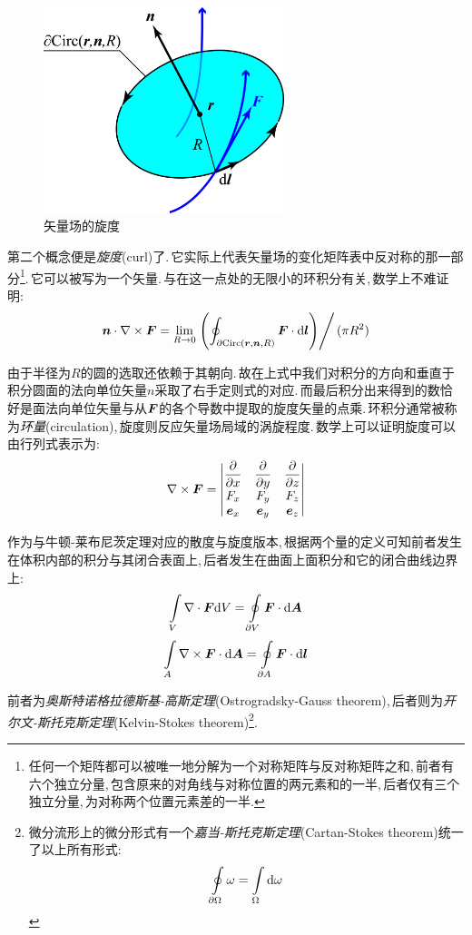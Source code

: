 \begin{figure}
\centering
\vspace{0.5cm}
\includegraphics[width=7cm]{image/7-1-5.png}
\caption{矢量场的旋度}
\end{figure}
第二个概念便是\emph{旋度}(curl)了.\,它实际上代表矢量场的变化矩阵表中反对称的那一部分\footnote{任何一个矩阵都可以被唯一地分解为一个对称矩阵与反对称矩阵之和,\,前者有六个独立分量,\,包含原来的对角线与对称位置的两元素和的一半,\,后者仅有三个独立分量,\,为对称两个位置元素差的一半.}.\,它可以被写为一个矢量.\,与在这一点处的无限小的环积分有关,\,数学上不难证明:
\[\boldsymbol{n}\cdot\nabla\times \boldsymbol{F}=\lim_{R\to 0}\left.\left(\oint_{\partial {\rm Circ}(\boldsymbol{r},\boldsymbol{n},R)}\boldsymbol{F}\cdot \textrm{d}\boldsymbol{l}\right)\right/(\pi R^2)\]

由于半径为$R$的圆的选取还依赖于其朝向.\,故在上式中我们对积分的方向和垂直于积分圆面的法向单位矢量$n$采取了右手定则式的对应.\,而最后积分出来得到的数恰好是面法向单位矢量与从$\boldsymbol{F}$的各个导数中提取的旋度矢量的点乘.\,环积分通常被称为\emph{环量}(circulation),\,旋度则反应矢量场局域的涡旋程度.\,数学上可以证明旋度可以由行列式表示为:
\[\nabla\times \boldsymbol{F}=\begin{vmatrix}
\dfrac{\partial}{\partial x}&\dfrac{\partial}{\partial y}&\dfrac{\partial}{\partial z}\\
F_x&F_y&F_z\\
\boldsymbol{e}_x&\boldsymbol{e}_y&\boldsymbol{e}_z
\end{vmatrix}\]

作为与牛顿-莱布尼茨定理对应的散度与旋度版本,\,根据两个量的定义可知前者发生在体积内部的积分与其闭合表面上,\,后者发生在曲面上面积分和它的闭合曲线边界上:
\[\int\limits_V \nabla\cdot \boldsymbol{F}\textrm{d} V=\oint\limits_{\partial V}\boldsymbol{F}\cdot\textrm{d}\boldsymbol{A}\]
\[\int\limits_A \nabla\times \boldsymbol{F}\cdot\textrm{d} \boldsymbol{A}=\oint\limits_{\partial A}\boldsymbol{F}\cdot\textrm{d}\boldsymbol{l}\]

前者为\emph{奥斯特诺格拉德斯基-高斯定理}(Ostrogradsky-Gauss theorem),\,后者则为\emph{开尔文-斯托克斯定理}(Kelvin-Stokes theorem)\footnote{微分流形上的微分形式有一个\emph{嘉当-斯托克斯定理}(Cartan-Stokes theorem)统一了以上所有形式:
\[\oint\limits_{\partial \Omega}\omega=\int\limits_\Omega \textrm{d} \omega\]}.


